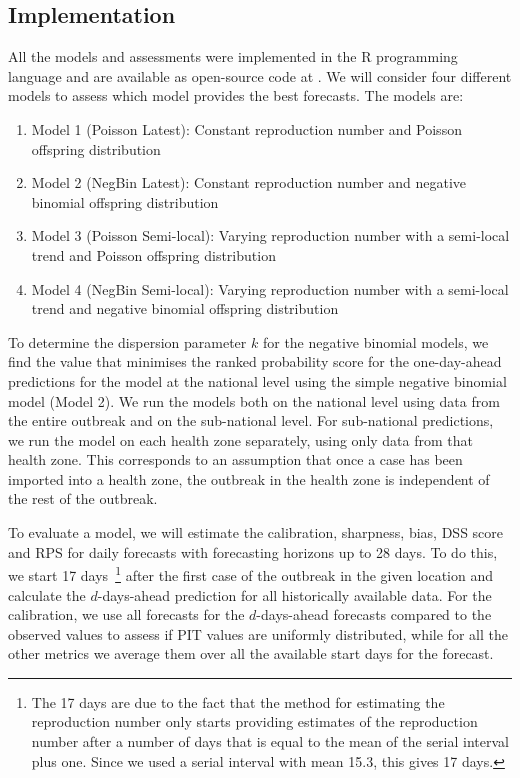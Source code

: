 \documentclass[12pt]{article}
\begin{document}
\subsection{Implementation}
All the models and assessments were implemented in the R programming language \cite{rcoreteamLanguageEnvironmentStatistical2018} and are available as open-source code at \cite{LinkSourceCode}. We will consider four different models to assess which model provides the best forecasts. The models are:

\begin{enumerate}
\item{Model 1 (Poisson Latest): Constant reproduction number and Poisson offspring distribution}
\item{Model 2 (NegBin Latest): Constant reproduction number and negative binomial offspring distribution}
\item{Model 3 (Poisson Semi-local): Varying reproduction number with a semi-local trend and Poisson offspring distribution}
\item{Model 4 (NegBin Semi-local): Varying reproduction number with a semi-local trend and negative binomial offspring distribution}
\end{enumerate}

To determine the dispersion parameter $k$ for the negative binomial models, we find the value that minimises the ranked probability score for the one-day-ahead predictions for the model at the national level using the simple negative binomial model (Model 2). We run the models both on the national level using data from the entire outbreak and on the sub-national level. For sub-national predictions, we run the model on each health zone separately, using only data from that health zone. This corresponds to an assumption that once a case has been imported into a health zone, the outbreak in the health zone is independent of the rest of the outbreak. 

To evaluate a model, we will estimate the calibration, sharpness, bias, DSS score and RPS for daily forecasts with forecasting horizons up to 28 days. To do this, we start 17 days~\footnote{The 17 days are due to the fact that the method for estimating the reproduction number only starts providing estimates of the reproduction number after a number of days that is equal to the mean of the serial interval plus one. Since we used a serial interval with mean 15.3, this gives 17 days.} after the first case of the outbreak in the given location and calculate the $d$-days-ahead prediction for all historically available data. For the calibration, we use all forecasts for the $d$-days-ahead forecasts compared to the observed values to assess if PIT values are uniformly distributed, while for all the other metrics we average them over all the available start days for the forecast.
\end{document}
